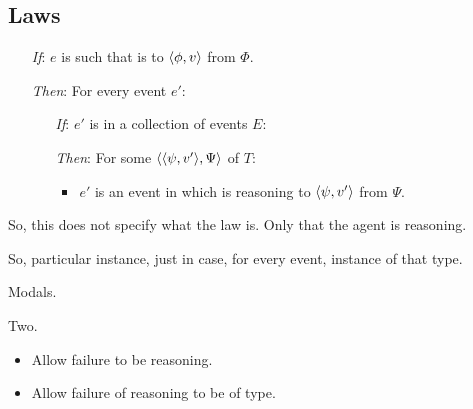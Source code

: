 \subsection{Laws}
\label{sec:law}

\begin{note}
  \begin{idea}
    \label{idea:tR-law}

    \begin{itemize}
    \item[\emph{If}:]
      \(e\) is such that \vAgent{} is \emph{\tR{}} to \(\langle \phi, v \rangle\) from \(\Phi\).
    \item[\emph{Then}:]
      For every event \(e'\):
      \begin{itemize}
      \item[\emph{If}:]
        \(e'\) is in a collection of events \(E\):
      \item[\emph{Then}:]
        For some \tI{} \(\langle \langle \psi, v' \rangle, \Psi \rangle\) of \(T\):
        \begin{itemize}
        \item
          \(e'\) is an event in which \vAgent{} is reasoning to \(\langle \psi, v' \rangle\) from \(\Psi\).
        \end{itemize}
      \end{itemize}
    \end{itemize}
    \vspace{-\baselineskip}
  \end{idea}

  So, this does not specify what the law is.
  Only that the agent is reasoning.

  So, particular instance, just in case, for every event, instance of that type.

  Modals.

  Two.

  \begin{itemize}
  \item
    Allow failure to be reasoning.
  \item
    Allow failure of reasoning to be of type.
  \end{itemize}
\end{note}

